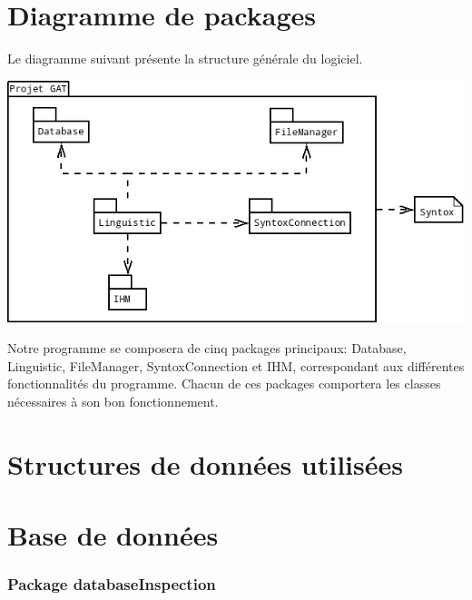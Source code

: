 \documentclass[12pt]{report}
\begin{document}
	



\section{Diagramme de packages}
Le diagramme suivant présente la structure générale du logiciel.

\begin{center}
\includegraphics[scale=0.45]{DiagPackages.png}
\end{center}


Notre programme se composera de cinq packages principaux: Database, Linguistic, FileManager, SyntoxConnection et IHM, correspondant aux différentes fonctionnalités du programme.
Chacun de ces packages comportera les classes nécessaires à son bon fonctionnement.





\section{Structures de données utilisées}

\section{Base de données}

\subsubsection*{Package databaseInspection}
\end{document}
